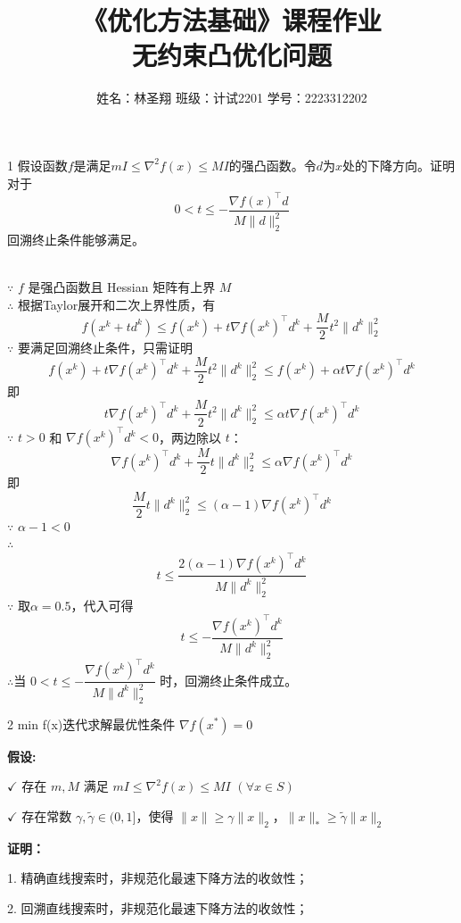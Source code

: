 \documentclass{article}
\newenvironment{problem_cn}[2][问题]{\begin{trivlist}
\item[\hskip \labelsep {\bfseries #1}\hskip \labelsep {\bfseries #2.}]}{\end{trivlist}}
\newenvironment{solution_cn}{%
  \begin{proof}[解答]%
  \kaishu  %
}{%
  \end{proof}%
}
\begin{document}

\title{《优化方法基础》课程作业\\无约束凸优化问题}  %
\author{姓名：林圣翔 \quad 班级：计试2201 \quad 学号：2223312202}  %

\maketitle

\begin{problem_cn}{1}
假设函数$f$是满足$mI \leq \nabla^2 f(x) \leq MI$的强凸函数。令$d$为$x$处的下降方向。证明对于  
$$
0 < t \leq -\frac{\nabla f(x)^\top d}{M\|d\|_2^2}
$$  
回溯终止条件能够满足。
\end{problem_cn}
\begin{solution_cn} 
\quad \\
$\because$ \( f \) 是强凸函数且 Hessian 矩阵有上界 \( M \) \\
$\therefore$ 根据Taylor展开和二次上界性质，有  
$$
f({x}^k + t{d}^k) \leq f({x}^k) + t\nabla f({x}^k)^\top {d}^k + \frac{M}{2} t^2 \|{d}^k\|_2^2
$$  
$\because$ 要满足回溯终止条件，只需证明
$$
f({x}^k) + t\nabla f({x}^k)^\top {d}^k + \frac{M}{2} t^2 \|{d}^k\|_2^2 \leq f({x}^k) + \alpha t\nabla f({x}^k)^\top {d}^k
$$
即
$$
t\nabla f({x}^k)^\top {d}^k + \frac{M}{2} t^2 \|{d}^k\|_2^2 \leq \alpha t\nabla f({x}^k)^\top {d}^k
$$
$\because$ \( t > 0 \) 和 \( \nabla f({x}^k)^\top {d}^k < 0 \)，两边除以 \( t \)：  
$$
\nabla f({x}^k)^\top {d}^k + \frac{M}{2} t \|{d}^k\|_2^2 \leq \alpha \nabla f({x}^k)^\top {d}^k
$$  
即 
$$
\frac{M}{2} t \|{d}^k\|_2^2 \leq (\alpha - 1)\nabla f({x}^k)^\top {d}^k
$$  
$\because$ \( \alpha -1< 0 \) \\
$\therefore$
$$
t \leq \frac{2(\alpha -1)\nabla f({x}^k)^\top {d}^k}{M \|{d}^k\|_2^2}
$$  
$\because$ 取\( \alpha = 0.5 \)，代入可得
$$
t \leq -\frac{\nabla f({x}^k)^\top {d}^k}{M \|{d}^k\|_2^2}
$$  
$\therefore$当 \( 0 < t \leq -\dfrac{\nabla f({x}^k)^\top {d}^k}{M \|{d}^k\|_2^2} \) 时，回溯终止条件成立。  
\end{solution_cn}
\vspace{0.25in}
\begin{problem_cn}{2}
min f(x)迭代求解最优性条件 $\nabla f(x^*) = 0$

\textbf{假设:}

$\checkmark$ 存在 $m,M$ 满足 $mI \leq \nabla^2 f(x) \leq MI$ $(\forall x \in S)$  
    
$\checkmark$ 存在常数 $\gamma, \tilde{\gamma} \in (0,1]$，使得 $\|x\| \geq \gamma \|x\|_2$，$\|x\|_* \geq \tilde{\gamma} \|x\|_2$  

\textbf{证明：}

1. 精确直线搜索时，非规范化最速下降方法的收敛性；  

2. 回溯直线搜索时，非规范化最速下降方法的收敛性；  
\end{problem_cn}
\end{document}
